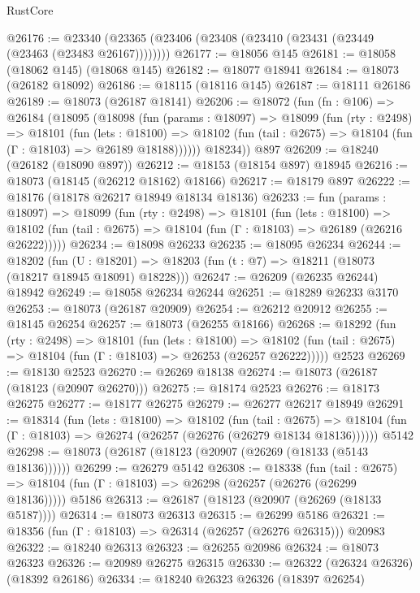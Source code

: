 \begin{lexlean}{RustCore}
\begin{coremodule}
@26176 := @23340 (@23365 (@23406 (@23408 (@23410 (@23431 (@23449 (@23463 (@23483 @26167))))))))
@26177 := @18056 @145
@26181 := @18058 (@18062 @145) (@18068 @145)
@26182 := @18077 @18941
@26184 := @18073 (@26182 @18092)
@26186 := @18115 (@18116 @145)
@26187 := @18111 @26186
@26189 := @18073 (@26187 @18141)
@26206 := @18072
    (fun (fn : @106) =>
    @26184
      (@18095
        (@18098
          (fun (params : @18097) =>
          @18099
            (fun (rty : @2498) =>
            @18101
              (fun (lets : @18100) =>
              @18102 (fun (tail : @2675) => @18104 (fun (Γ : @18103) => @26189 @18188))))))
        @18234))
    @897
@26209 := @18240 (@26182 (@18090 @897))
@26212 := @18153 (@18154 @897) @18945
@26216 := @18073 (@18145 (@26212 @18162) @18166)
@26217 := @18179 @897
@26222 := @18176 (@18178 @26217 @18949 @18134 @18136)
@26233 := fun (params : @18097) =>
  @18099
    (fun (rty : @2498) =>
    @18101
      (fun (lets : @18100) =>
      @18102 (fun (tail : @2675) => @18104 (fun (Γ : @18103) => @26189 (@26216 @26222)))))
@26234 := @18098 @26233
@26235 := @18095 @26234
@26244 := @18202
    (fun (U : @18201) => @18203 (fun (t : @7) => @18211 (@18073 (@18217 @18945 @18091) @18228)))
@26247 := @26209 (@26235 @26244) @18942
@26249 := @18058 @26234 @26244
@26251 := @18289 @26233 @3170
@26253 := @18073 (@26187 @20909)
@26254 := @26212 @20912
@26255 := @18145 @26254
@26257 := @18073 (@26255 @18166)
@26268 := @18292
    (fun (rty : @2498) =>
    @18101
      (fun (lets : @18100) =>
      @18102 (fun (tail : @2675) => @18104 (fun (Γ : @18103) => @26253 (@26257 @26222)))))
    @2523
@26269 := @18130 @2523
@26270 := @26269 @18138
@26274 := @18073 (@26187 (@18123 (@20907 @26270)))
@26275 := @18174 @2523
@26276 := @18173 @26275
@26277 := @18177 @26275
@26279 := @26277 @26217 @18949
@26291 := @18314
    (fun (lets : @18100) =>
    @18102
      (fun (tail : @2675) =>
      @18104 (fun (Γ : @18103) => @26274 (@26257 (@26276 (@26279 @18134 @18136))))))
    @5142
@26298 := @18073 (@26187 (@18123 (@20907 (@26269 (@18133 (@5143 @18136))))))
@26299 := @26279 @5142
@26308 := @18338
    (fun (tail : @2675) => @18104 (fun (Γ : @18103) => @26298 (@26257 (@26276 (@26299 @18136)))))
    @5186
@26313 := @26187 (@18123 (@20907 (@26269 (@18133 @5187))))
@26314 := @18073 @26313
@26315 := @26299 @5186
@26321 := @18356 (fun (Γ : @18103) => @26314 (@26257 (@26276 @26315))) @20983
@26322 := @18240 @26313
@26323 := @26255 @20986
@26324 := @18073 @26323
@26326 := @20989 @26275 @26315
@26330 := @26322 (@26324 @26326) (@18392 @26186)
@26334 := @18240 @26323 @26326 (@18397 @26254)

\end{coremodule}
\end{lexlean}
